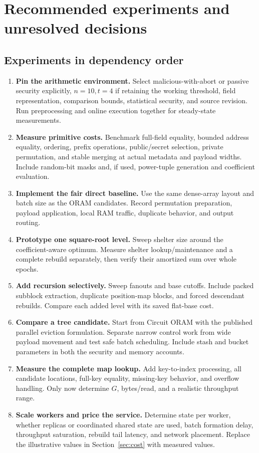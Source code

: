 \documentclass[11pt]{article}
\begin{document}
\section{Recommended experiments and unresolved decisions}\label{sec:next}

\subsection{Experiments in dependency order}

\begin{enumerate}
\item \textbf{Pin the arithmetic environment.} Select malicious-with-abort or
passive security explicitly, $n=10,t=4$ if retaining the working threshold,
field representation, comparison bounds, statistical security, and source
revision. Run preprocessing and online execution together for steady-state
measurements.
\item \textbf{Measure primitive costs.} Benchmark full-field equality, bounded
address equality, ordering, prefix operations, public/secret selection, private
permutation, and stable merging at actual metadata and payload widths. Include
random-bit masks and, if used, power-tuple generation and coefficient evaluation.
\item \textbf{Implement the fair direct baseline.} Use the same dense-array
layout and batch size as the ORAM candidates. Record permutation preparation,
payload application, local RAM traffic, duplicate behavior, and output routing.
\item \textbf{Prototype one square-root level.} Sweep shelter size around the
coefficient-aware optimum. Measure shelter lookup/maintenance and a complete
rebuild separately, then verify their amortized sum over whole epochs.
\item \textbf{Add recursion selectively.} Sweep fanouts and base cutoffs.
Include packed subblock extraction, duplicate position-map blocks, and forced
descendant rebuilds. Compare each added level with its saved flat-base cost.
\item \textbf{Compare a tree candidate.} Start from Circuit ORAM with the
published parallel eviction formulation. Separate narrow control work from
wide payload movement and test safe batch scheduling. Include stash and bucket
parameters in both the security and memory accounts.
\item \textbf{Measure the complete map lookup.} Add key-to-index processing,
all candidate locations, full-key equality, missing-key behavior, and overflow
handling. Only now determine $G$, bytes/read, and a realistic throughput range.
\item \textbf{Scale workers and price the service.} Determine state per worker,
whether replicas or coordinated shared state are used, batch formation delay,
throughput saturation, rebuild tail latency, and network placement. Replace the
illustrative values in Section~\ref{sec:cost} with measured values.
\end{enumerate}
\end{document}
